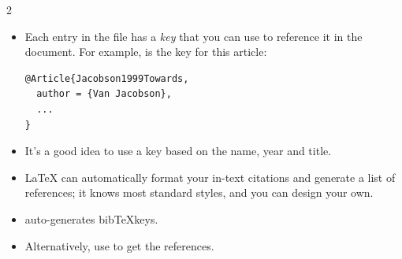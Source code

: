\documentclass[10pt,times]{beamer}
\begin{document}
\begin{frame}[fragile]{\insertsubsection{} 2}
\begin{itemize}
\item Each entry in the  file has a \emph{key} that you can use to
reference it in the document. For example,  is the 
key for this article:
\begin{verbatim}
@Article{Jacobson1999Towards,
  author = {Van Jacobson},
  ...
}
\end{verbatim}
\item It's a good idea to use a key based on the name, year and title.
\item \LaTeX{} can automatically format your in-text citations and generate a
list of references; it knows most standard styles, and you can design your own.
\item {} auto-generates bib\TeX keys.
\item Alternatively, use  to get the references.
\end{itemize}
\end{frame}
\end{document}
